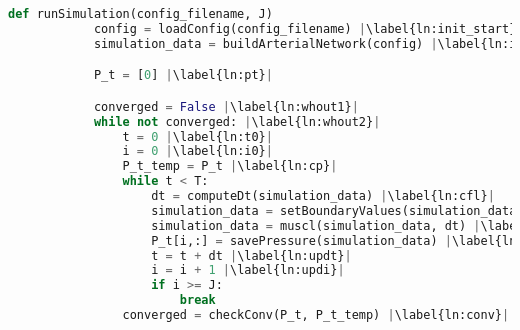 \documentclass{beamer}
\begin{document}
\begin{frame} [fragile]
	\begin{lstlisting}[basicstyle=\fontsize{8}{8}\selectfont\ttfamily, language=Python, caption=The code structure of an entire simulation is given here in pseudocode. Each line is detailed throughout this section., label=lst:pc, escapechar=|] 
		def runSimulation(config_filename, J) 
			config = loadConfig(config_filename) |\label{ln:init_start}|
			simulation_data = buildArterialNetwork(config) |\label{ln:init_end}|

			P_t = [0] |\label{ln:pt}|

			converged = False |\label{ln:whout1}|
			while not converged: |\label{ln:whout2}|
				t = 0 |\label{ln:t0}|
				i = 0 |\label{ln:i0}|
				P_t_temp = P_t |\label{ln:cp}|
				while t < T:
					dt = computeDt(simulation_data) |\label{ln:cfl}|
					simulation_data = setBoundaryValues(simulation_data, dt) |\label{ln:bv    }|
					simulation_data = muscl(simulation_data, dt) |\label{ln:muscl}|
					P_t[i,:] = savePressure(simulation_data) |\label{ln:svp}|
					t = t + dt |\label{ln:updt}|
					i = i + 1 |\label{ln:updi}|
					if i >= J:
						break
				converged = checkConv(P_t, P_t_temp) |\label{ln:conv}|
	\end{lstlisting}
\end{frame}
\end{document}
